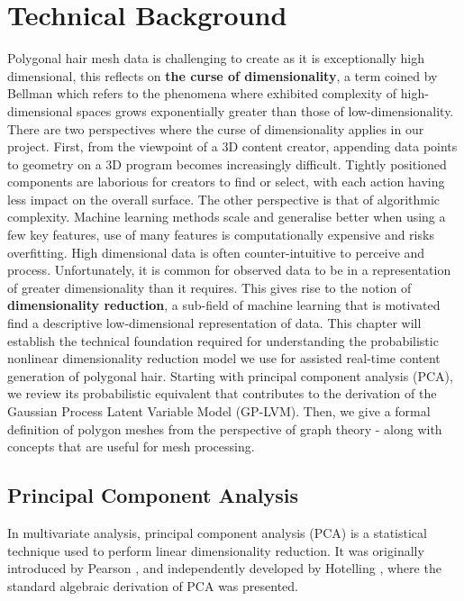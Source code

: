 \documentclass[ %
author={Dillon Keith Diep},
supervisor={Dr. Carl Henrik Ek},
degree={MEng},
title={ART-CG Hair:},
subtitle={Assisted Real-time Content Generation of Stylised Virtual Hair},
type={Research},
year={2017} ]{dissertation}
\begin{document}
	
	\chapter{Technical Background}
	\label{chap:technical}
	Polygonal hair mesh data is challenging to create as it is exceptionally high dimensional, this reflects on \textbf{the curse of dimensionality}, a term coined by Bellman \cite{curseofdim} which refers to the phenomena where exhibited complexity of high-dimensional spaces grows exponentially greater than those of low-dimensionality. There are two perspectives where the curse of dimensionality applies in our project. First, from the viewpoint of a 3D content creator, appending data points to geometry on a 3D program becomes increasingly difficult. Tightly positioned components are laborious for creators to find or select, with each action having less impact on the overall surface. The other perspective is that of algorithmic complexity. Machine learning methods scale and generalise better when using a few key features, use of many features is computationally expensive and risks overfitting. High dimensional data is often counter-intuitive to perceive and process. Unfortunately, it is common for observed data to be in a representation of greater dimensionality than it requires. This gives rise to the notion of \textbf{dimensionality reduction}, a sub-field of machine learning that is motivated find a descriptive low-dimensional representation of data.
	This chapter will establish the technical foundation required for understanding the probabilistic nonlinear dimensionality reduction model we use for assisted real-time content generation of polygonal hair. Starting with principal component analysis (PCA), we review its probabilistic equivalent that contributes to the derivation of the Gaussian Process Latent Variable Model (GP-LVM). Then, we give a formal definition of polygon meshes from the perspective of graph theory - along with concepts that are useful for mesh processing.
	
	\section{Principal Component Analysis}
	In multivariate analysis, principal component analysis (PCA) is a statistical technique used to perform linear dimensionality reduction. It was originally introduced by Pearson \cite{pca1901}, and independently developed by Hotelling \cite{pca1933}, where the standard algebraic derivation of PCA was presented.
	
\end{document}
